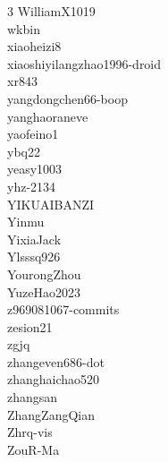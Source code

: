 \documentclass{article}
\begin{document}
\begin{multicols}{3}
WilliamX1019\\
wkbin\\
xiaoheizi8\\
xiaoshiyilangzhao1996-droid\\
xr843\\
yangdongchen66-boop\\
yanghaoraneve\\
yaofeino1\\
ybq22\\
yeasy1003\\
yhz-2134\\
YIKUAIBANZI\\
Yinmu\\
YixiaJack\\
Ylsssq926\\
YourongZhou\\
YuzeHao2023\\
z969081067-commits\\
zesion21\\
zgjq\\
zhangeven686-dot\\
zhanghaichao520\\
zhangsan\\
ZhangZangQian\\
Zhrq-vis\\
ZouR-Ma
\end{multicols}
\endgroup



\end{document}
